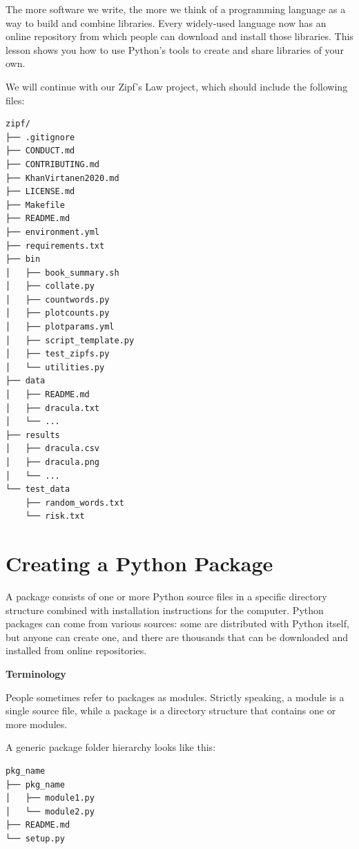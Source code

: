 \documentclass[
]{krantz}
\renewenvironment{quote}{\begin{VF}}{\end{VF}}
\begin{document}
The more software we write,
the more we think of a programming language as a way to build and combine libraries.
Every widely-used language now has an online repository
from which people can download and install those libraries.
This lesson shows you how to use Python's tools to create and share libraries of your own.

We will continue with our Zipf's Law project,
which should include the following files:

\begin{verbatim}
zipf/
├── .gitignore
├── CONDUCT.md
├── CONTRIBUTING.md
├── KhanVirtanen2020.md
├── LICENSE.md
├── Makefile
├── README.md
├── environment.yml
├── requirements.txt
├── bin
│   ├── book_summary.sh
│   ├── collate.py
│   ├── countwords.py
│   ├── plotcounts.py
│   ├── plotparams.yml
│   ├── script_template.py
│   ├── test_zipfs.py
│   └── utilities.py
├── data
│   ├── README.md
│   ├── dracula.txt
│   └── ...
├── results
│   ├── dracula.csv
│   ├── dracula.png
│   └── ...
└── test_data
    ├── random_words.txt
    └── risk.txt
\end{verbatim}

\hypertarget{packaging-package}{%
\section{Creating a Python Package}\label{packaging-package}}

A package consists of one or more Python source files
in a specific directory structure
combined with installation instructions for the computer.
Python packages can come from various sources:
some are distributed with Python itself,
but anyone can create one,
and there are thousands that can be downloaded and installed from online repositories.

\begin{quote}
\textbf{Terminology}

People sometimes refer to packages as modules.
Strictly speaking,
a module is a single source file,
while a package is a directory structure that contains one or more modules.
\end{quote}

A generic package folder hierarchy looks like this:

\begin{verbatim}
pkg_name
├── pkg_name
│   ├── module1.py
│   └── module2.py
├── README.md
└── setup.py
\end{verbatim}
\end{document}
